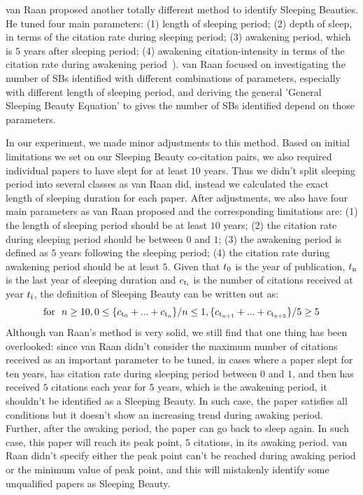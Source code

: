 \documentclass[utf8]{frontiersSCNS}
\begin{document}
van Raan proposed another totally different method to identify Sleeping Beauties. He tuned four main parameters: (1) length of sleeping period; (2) depth of sleep, in terms of the citation rate during sleeping period; (3) awakening period, which is $5$ years after sleeping period; (4) awakening citation-intensity in terms of the citation rate during awakening period~\citep{Raan2019}). van Raan focused on investigating the number of SBs identified with different combinations of parameters, especially with different length of sleeping period, and deriving the general 'General Sleeping Beauty Equation' to gives the number of SBs identified depend on those parameters. 

In our experiment, we made minor adjustments to this method. Based on initial limitations we set on our Sleeping Beauty co-citation pairs, we also required individual papers to have slept for at least $10$ years. Thus we didn't split sleeping period into several classes as van Raan did, instead we calculated the exact length of sleeping duration for each paper. After adjustments, we also have four main parameters as van Raan proposed and the corresponding limitations are: (1) the length of sleeping period should be at least $10$ years; (2) the citation rate during sleeping period should be between $0$ and $1$; (3) the awakening period is defined as $5$ years following the sleeping period; (4) the citation rate during awakening period should be at least $5$. Given that $t\textsubscript{0}$ is the year of publication, $t\textsubscript{n}$ is the last year of sleeping duration and $c\textsubscript{$t\textsubscript{i}$}$ is the number of citations received at year $t\textsubscript{i}$, the definition of Sleeping Beauty can be written out as:
\begin{equation}
\text{for }\ n \geq 10, 0 \leq \{c\textsubscript{t\textsubscript{0}} + ... + c\textsubscript{t\textsubscript{n}}\}/n \leq 1, \{c\textsubscript{t\textsubscript{n+1}} + ... + c\textsubscript{t\textsubscript{n+5}}\}/5 \geq 5
\end{equation}
Although van Raan's method is very solid, we still find that one thing has been overlooked: since van Raan didn't consider the maximum number of citations received as an important parameter to be tuned, in cases where a paper slept for ten years, has citation rate during sleeping period between $0$ and $1$, and then has received $5$ citations each year for $5$ years, which is the awakening period, it shouldn't be identified as a Sleeping Beauty. In such case, the paper satisfies all conditions but it doesn't show an increasing trend during awaking period. Further, after the awaking period, the paper can go back to sleep again. In such case, this paper will reach its peak point, $5$ citations, in its awaking period. van Raan didn't specify either the peak point can't be reached during awaking period or the minimum value of peak point, and this will mistakenly identify some unqualified papers as Sleeping Beauty.
\end{document}
